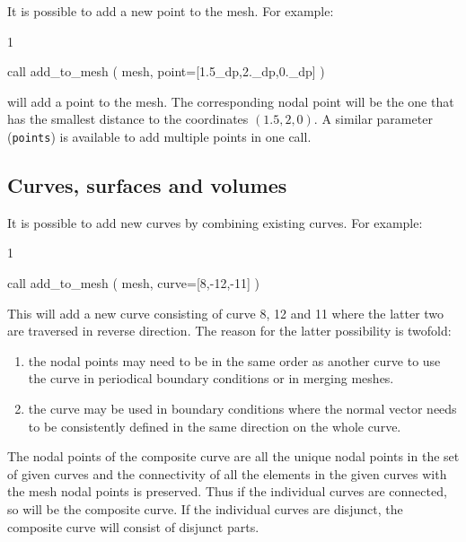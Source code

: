 It is possible to add a new point to the mesh.
For example:
\begin{listing}{1}

  call add_to_mesh ( mesh, point=[1.5_dp,2._dp,0._dp] )
   
\end{listing}
will add a point to the mesh. The corresponding nodal point
will be the one that has the smallest distance to the coordinates
$(1.5,2,0)$. A similar parameter (\texttt{points}) is available to add multiple
points in one call.

\subsection{Curves, surfaces and volumes}
\label{sec:addcurves}

It is possible to add new curves by combining existing curves.
For example:
\begin{listing}{1}

  call add_to_mesh ( mesh, curve=[8,-12,-11] )
   
\end{listing}
This will add a new curve consisting of curve 8, 12 and 11 where the latter two
are traversed in reverse direction. 
The reason for the latter possibility is twofold:
\begin{enumerate}
     \item the nodal points may need to be in the same order as another curve to
       use the curve in periodical boundary conditions or in merging meshes.
     \item the curve may be used in boundary conditions where the normal vector
       needs to be consistently defined in the same direction on the whole
       curve.
\end{enumerate}
The nodal points of the composite curve are all the unique nodal points
in the set of given curves and the connectivity of all the elements
in the given curves with the mesh nodal points is preserved. Thus if the
individual curves are connected, so will be the composite curve. If the
individual curves are disjunct, the composite curve will consist of
disjunct parts.

